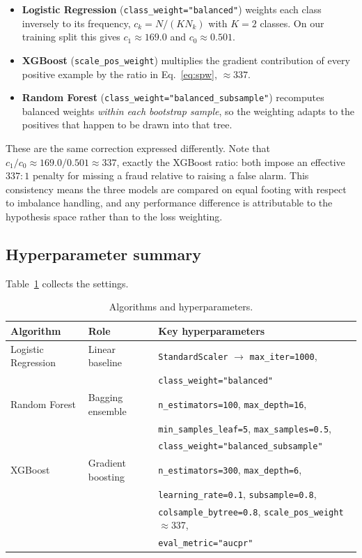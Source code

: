 \documentclass{article}
\begin{document}
\begin{itemize}
    \item \textbf{Logistic Regression} (\texttt{class\_weight="balanced"})
    weights each class inversely to its frequency,
    $c_k = N / (K N_k)$ with $K = 2$ classes. On our training split
    this gives $c_1 \approx 169.0$ and $c_0 \approx 0.501$.
    \item \textbf{XGBoost} (\texttt{scale\_pos\_weight}) multiplies the
    gradient contribution of every positive example by the ratio in
    Eq.~\ref{eq:spw}, $\approx 337$.
    \item \textbf{Random Forest}
    (\texttt{class\_weight="balanced\_subsample"}) recomputes balanced
    weights \emph{within each bootstrap sample}, so the weighting
    adapts to the positives that happen to be drawn into that tree.
\end{itemize}

These are the same correction expressed differently. Note that
$c_1 / c_0 \approx 169.0 / 0.501 \approx 337$, exactly the XGBoost
ratio: both impose an effective $337{:}1$ penalty for missing a fraud
relative to raising a false alarm. This consistency means the three
models are compared on equal footing with respect to imbalance
handling, and any performance difference is attributable to the
hypothesis space rather than to the loss weighting.

\subsection{Hyperparameter summary}
Table~\ref{tab:hyper} collects the settings.

\begin{table}[H]
\centering
\caption{Algorithms and hyperparameters.}
\label{tab:hyper}
\small
\begin{tabular}{lll}
\toprule
Algorithm & Role & Key hyperparameters \\
\midrule
Logistic Regression & Linear baseline &
  \texttt{StandardScaler} $\to$ \texttt{max\_iter=1000}, \\
 & & \texttt{class\_weight="balanced"} \\
\midrule
Random Forest & Bagging ensemble &
  \texttt{n\_estimators=100}, \texttt{max\_depth=16}, \\
 & & \texttt{min\_samples\_leaf=5}, \texttt{max\_samples=0.5}, \\
 & & \texttt{class\_weight="balanced\_subsample"} \\
\midrule
XGBoost & Gradient boosting &
  \texttt{n\_estimators=300}, \texttt{max\_depth=6}, \\
 & & \texttt{learning\_rate=0.1}, \texttt{subsample=0.8}, \\
 & & \texttt{colsample\_bytree=0.8}, \texttt{scale\_pos\_weight}$\approx$337, \\
 & & \texttt{eval\_metric="aucpr"} \\
\bottomrule
\end{tabular}
\end{table}
\end{document}
